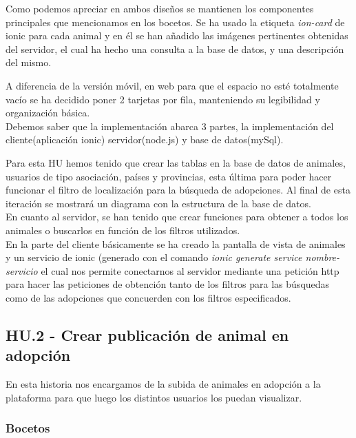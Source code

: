 Como podemos apreciar en ambos diseños se mantienen los componentes principales que mencionamos en los bocetos. Se ha usado la etiqueta \textit{ion-card} de ionic para cada animal y en él se han añadido las imágenes pertinentes obtenidas del servidor, el cual ha hecho una consulta a la base de datos, y una descripción del mismo.

A diferencia de la versión móvil, en web para que el espacio no esté totalmente vacío se ha decidido poner 2 tarjetas por fila, manteniendo su legibilidad y organización básica. \\

Debemos saber que la implementación abarca 3 partes, la implementación del cliente(aplicación ionic) servidor(node.js) y base de datos(mySql).

Para esta HU hemos tenido que crear las tablas en la base de datos de animales, usuarios de tipo asociación, países y provincias, esta última para poder hacer funcionar el filtro de localización para la búsqueda de adopciones. Al final de esta iteración se mostrará un diagrama con la estructura de la base de datos.\\

En cuanto al servidor, se han tenido que crear funciones para obtener a todos los animales o buscarlos en función de los filtros utilizados. \\

En la parte del cliente básicamente se ha creado la pantalla de vista de animales y un servicio de ionic (generado con el comando \textit{ionic generate service nombre-servicio} el cual nos permite conectarnos al servidor mediante una petición http para hacer las peticiones de obtención tanto de los filtros para las búsquedas como de las adopciones que concuerden con los filtros especificados. \\ 



\subsection{HU.2 - Crear publicación de animal en adopción}


En esta historia nos encargamos de la subida de animales en adopción a la plataforma para que luego los distintos usuarios los puedan visualizar. \\

\subsubsection{Bocetos}

